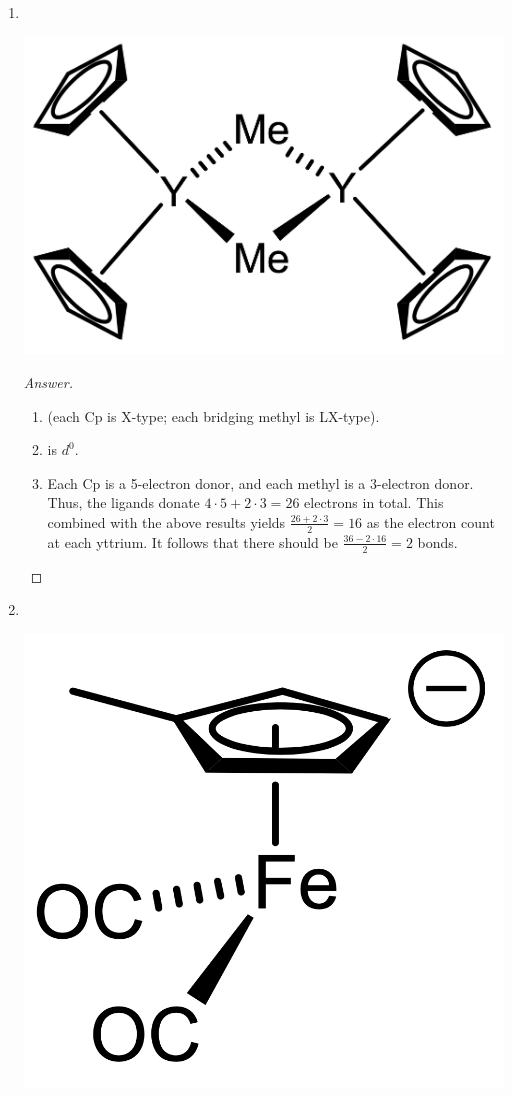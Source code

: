 \documentclass[../psets.tex]{subfiles}
\begin{document}
\begin{enumerate}
\begin{enumerate}[label={\arabic*)}]
\begin{center}
        \end{center}
        \begin{proof}[Answer]\leavevmode
            \begin{enumerate}[label={(\roman*)}]
                \item {} (each carbonyl is L-type; both phosphines are L-type; the other ligand is L-type).
                \item {} is $d^6$.
                \item Each carbonyl is a 2-electron donor, both phosphines are 2-electron donors, and the other ligand is a 2-electron donor. Thus, the ligands donate $3\cdot 2+2\cdot 2+1\cdot 2=12$ electrons in total. This combined with the above results yields $12+6=18$ as the electron count.
            \end{enumerate}
        \end{proof}
        \newpage
        \item ${\color{white}hi}$
        \begin{center}
            \includegraphics[width=0.32\linewidth]{../ExtFiles/pset1-1-10.png}
        \end{center}
        \begin{proof}[Answer]\leavevmode
            \begin{enumerate}[label={(\roman*)}]
                \item {} (each Cp is X-type; each bridging methyl is LX-type).
                \item {} is $d^0$.
                \item Each Cp is a 5-electron donor, and each methyl is a 3-electron donor. Thus, the ligands donate $4\cdot 5+2\cdot 3=26$ electrons in total. This combined with the above results yields $\frac{26+2\cdot 3}{2}=16$ as the electron count at each yttrium. It follows that there should be $\frac{36-2\cdot 16}{2}=2$  bonds.
            \end{enumerate}
        \end{proof}
        \item ${\color{white}hi}$
        \begin{center}
            \includegraphics[width=0.18\linewidth]{../ExtFiles/pset1-1-11.png}

\end{center}
\end{enumerate}
\end{enumerate}
\end{document}
